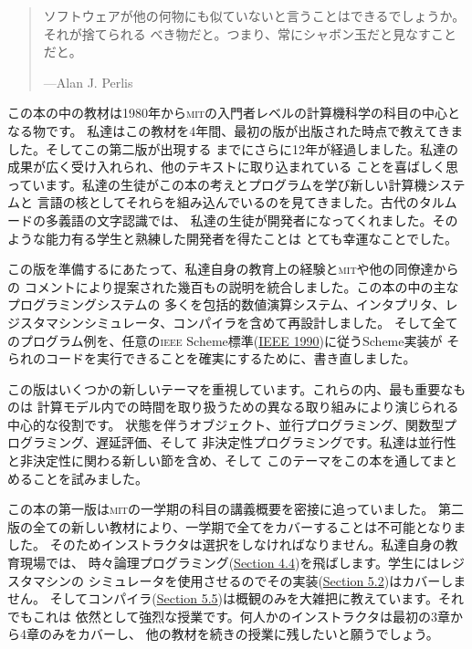 \documentclass[oneside]{book}
\newcommand{\acronym}[1]{\textsc{\MakeLowercase{#1}}}
\newcommand{\link}[1]{\hyperref[#1]{#1}}
\begin{document}
\begin{quote}
ソフトウェアが他の何物にも似ていないと言うことはできるでしょうか。それが捨てられる
べき物だと。つまり、常にシャボン玉だと見なすことだと。

---Alan J. Perlis
\end{quote}

\vspace{0.7em}

\noindent
この本の中の教材は1980年から\acronym{MIT}の入門者レベルの計算機科学の科目の中心となる物です。
私達はこの教材を4年間、最初の版が出版された時点で教えてきました。そしてこの第二版が出現する
までにさらに12年が経過しました。私達の成果が広く受け入れられ、他のテキストに取り込まれている
ことを喜ばしく思っています。私達の生徒がこの本の考えとプログラムを学び新しい計算機システムと
言語の核としてそれらを組み込んでいるのを見てきました。古代のタルムードの多義語の文字認識では、
私達の生徒が開発者になってくれました。そのような能力有る学生と熟練した開発者を得たことは
とても幸運なことでした。



この版を準備するにあたって、私達自身の教育上の経験と\acronym{MIT}や他の同僚達からの
コメントにより提案された幾百もの説明を統合しました。この本の中の主なプログラミングシステムの
多くを包括的数値演算システム、インタプリタ、レジスタマシンシミュレータ、コンパイラを含めて再設計しました。
そして全てのプログラム例を、任意の\acronym{IEEE} Scheme標準(\link{IEEE 1990})に従うScheme実装が
そられのコードを実行できることを確実にするために、書き直しました。


この版はいくつかの新しいテーマを重視しています。これらの内、最も重要なものは
計算モデル内での時間を取り扱うための異なる取り組みにより演じられる中心的な役割です。
状態を伴うオブジェクト、並行プログラミング、関数型プログラミング、遅延評価、そして
非決定性プログラミングです。私達は並行性と非決定性に関わる新しい節を含め、そして
このテーマをこの本を通してまとめることを試みました。



この本の第一版は\acronym{MIT}の一学期の科目の講義概要を密接に追っていました。
第二版の全ての新しい教材により、一学期で全てをカバーすることは不可能となりました。
そのためインストラクタは選択をしなければなりません。私達自身の教育現場では、
時々論理プログラミング(\link{Section 4.4})を飛ばします。学生にはレジスタマシンの
シミュレータを使用させるのでその実装(\link{Section 5.2})はカバーしません。
そしてコンパイラ(\link{Section 5.5})は概観のみを大雑把に教えています。それでもこれは
依然として強烈な授業です。何人かのインストラクタは最初の3章から4章のみをカバーし、
他の教材を続きの授業に残したいと願うでしょう。
\end{document}
